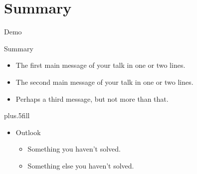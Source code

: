 \section*{Summary}

\begin{frame}{Demo}
\end{frame}

\begin{frame}{Summary}

  \begin{itemize}
  \item
    The \alert{first main message} of your talk in one or two lines.
  \item
    The \alert{second main message} of your talk in one or two lines.
  \item
    Perhaps a \alert{third message}, but not more than that.
  \end{itemize}
  
  \vskip0pt plus.5fill
  \begin{itemize}
  \item
    Outlook
    \begin{itemize}
    \item
      Something you haven't solved.
    \item
      Something else you haven't solved.
    \end{itemize}
  \end{itemize}
\end{frame}




